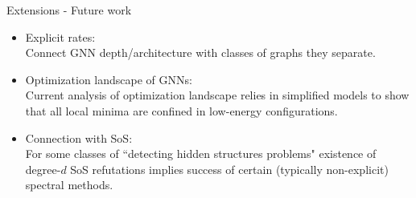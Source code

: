 \documentclass{beamer}
\begin{document}
\begin{frame}{Extensions - Future work}
\begin{itemize}
\item Explicit rates: \\ {\footnotesize Connect GNN depth/architecture with classes of graphs they separate.}
\vfill
\item Optimization landscape of GNNs: \\
{\footnotesize Current analysis of optimization landscape relies in simplified models to show that all local minima are confined in low-energy configurations.}
\vfill
\item Connection with SoS: \\
{\footnotesize For some classes of ``detecting hidden structures problems" existence of degree-$d$ SoS refutations implies success of certain (typically non-explicit) spectral methods.}

\end{itemize}
\let\thefootnote\relax{}
\end{frame}
\end{document}
